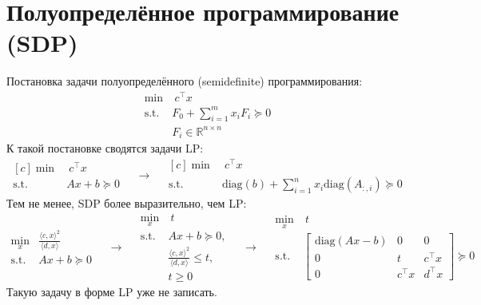 \documentclass[11pt,a4paper]{report}
\def\Real{\mathbb{R}}
\def\le{\leqslant}
\def\ge{\geqslant}
\theoremstyle{definition}
\theoremstyle{definition}
\theoremstyle{definition}
\begin{document}
	\section{Полуопределённое программирование (SDP)}
	Постановка задачи полуопределённого (semidefinite) программирования:
	\begin{align*}
		\min&\ c^{\top} x\\
		\text{s.t. }& F_0 + \sum_{i=1}^{m} x_i F_i \succeq 0\\
		&F_i \in \Real^{n \times n}
	\end{align*}
	К такой постановке сводятся задачи LP:
		\begin{equation*}
		\begin{aligned}[c]
			\min&\ c^{\top} x\\
			\text{s.t. }& Ax + b \succeq 0
		\end{aligned}
		\quad \longrightarrow \quad
		\begin{aligned}[c]
			\min&\ c^{\top} x\\
			\text{s.t. }& \mathrm{diag}(b) + \sum_{i=1}^{n} x_i \mathrm{diag}(A_{:, i}) \succeq 0
		\end{aligned}
	\end{equation*}
	Тем не менее, SDP более выразительно, чем LP: 
	\begin{equation*}
		\begin{aligned}
			\min_{x}& \frac{\langle c, x \rangle^2}{\langle d, x \rangle}\\
			\text{s.t. }& Ax + b \succeq 0
		\end{aligned} \quad\longrightarrow\quad
		\begin{aligned}
			\min_{x}&\ t\\
			\text{s.t. }& Ax + b \succeq 0,\\
			&\frac{\langle c, x \rangle^2}{\langle d, x \rangle} \le t,\\
			&t \ge 0
		\end{aligned} \quad\longrightarrow\quad
		\begin{aligned}
			\min_{x}&\ t\\
			\text{s.t. }& \begin{bmatrix}
				\mathrm{diag}(Ax - b) &0 &0\\
				0 & t & c^{\top} x\\
				0 & c^{\top} x & d^{\top} x
			\end{bmatrix} \succeq 0
		\end{aligned} 
	\end{equation*}
	\noindent Такую задачу в форме LP уже не записать.\\
\end{document}
